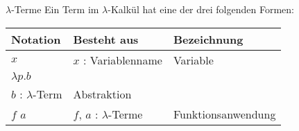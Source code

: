 \documentclass{beamer}
\begin{document}
\newcommand{\subst}[3]{(#1)\left[#2\,\to\,#3\right]}
\newcommand{\abs}[2]{\lambda{}#1.#2}
\newcommand{\reducesTo}[1]{\stackrel{#1}{\implies}}
\newcommand{\tikzmark}[3]{\tikz[baseline, remember picture]{
	\node[fill=#1,draw] (#2) {#3};
}}

\newcommand{\typeRule}[3]{\frac{#2}{#3} \textrm{\textsc{#1}}}

\begin{frame}{$\lambda$-Terme}
	Ein Term im $\lambda$-Kalkül hat eine der drei folgenden Formen:

	\vspace{0.5cm}

	\begin{tabularx}{\textwidth}{ X | X | X }
		\textbf{Notation} & \textbf{Besteht aus}                      & \textbf{Bezeichnung} \\
		\hline
		$x$               & $x$ : Variablenname                       & Variable             \\
		\hline
		$\lambda{}p.b$    &
			\begin{tabular}[t]{@{}c@{}}$p$ : Variablenname\\$b$ : $\lambda$-Term\end{tabular}
									      & Abstraktion          \\
		\hline
		$f$ $a$           & $f$, $a$ : $\lambda$-Terme                & Funktionsanwendung   \\
	\end{tabularx}
\end{frame}
\end{document}
